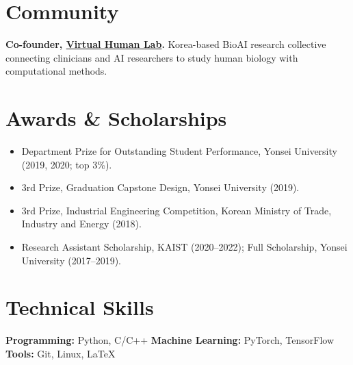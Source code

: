 \documentclass[10pt,letterpaper]{article}
\begin{document}
\section*{Community}
\textbf{Co-founder, \href{https://www.virtualhumanlab.com/}{Virtual Human Lab}.} Korea-based BioAI research collective connecting clinicians and AI researchers to study human biology with computational methods.

\section*{Awards \& Scholarships}
\begin{itemize}
  \item Department Prize for Outstanding Student Performance, Yonsei University (2019, 2020; top 3\%).
  \item 3rd Prize, Graduation Capstone Design, Yonsei University (2019).
  \item 3rd Prize, Industrial Engineering Competition, Korean Ministry of Trade, Industry and Energy (2018).
  \item Research Assistant Scholarship, KAIST (2020--2022); Full Scholarship, Yonsei University (2017--2019).
\end{itemize}

\section*{Technical Skills}
\textbf{Programming:} Python, C/C++ \quad
\textbf{Machine Learning:} PyTorch, TensorFlow \quad
\textbf{Tools:} Git, Linux, \LaTeX
\end{document}
